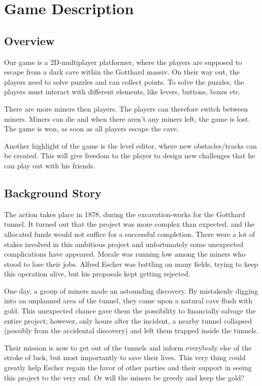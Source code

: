 \section{Game Description}

\subsection{Overview}
Our game is a 2D-multiplayer platformer, where the players are supposed to escape from a dark cave within the Gotthard massiv. On their way out, the players need to solve puzzles and can collect points. To solve the puzzles, the players must interact with different elements, like levers, buttons, boxes etc.

There are more miners then players. The players can therefore switch between miners. Miners can die and when there aren't any miners left, the game is lost. The game is won, as soon as all players escape the cave.

Another highlight of the game is the level editor, where new obstacles/tracks can be created. This will give freedom to the player to design new challenges that he can play out with his friends.


\subsection{Background Story}

The action takes place in 1878, during the excavation-works for the Gotthard tunnel. It turned out that the project was more complex than expected, and the allocated funds would not suffice for a successful completion. There were a lot of stakes involved in this ambitious project and unfortunately some unexpected complications have appeared. Morale was running low among the miners who stood to lose their jobs. Alfred Escher was battling on many fields, trying to keep this operation alive, but his proposals kept getting rejected. 

One day, a group of miners made an astounding discovery. By mistakenly digging into an unplanned area of the tunnel, they came upon a natural cave flush with gold. This unexpected chance gave them the possibility to financially salvage the entire project; however, only hours after the incident, a nearby tunnel collapsed (possibly from the accidental discovery) and left them trapped inside the tunnels. 

Their mission is now to get out of the tunnels and inform everybody else of the stroke of luck, but most importantly to save their lives. This very thing could greatly help Escher regain the favor of other parties and their support in seeing this project to the very end. Or will the miners be greedy and keep the gold?

